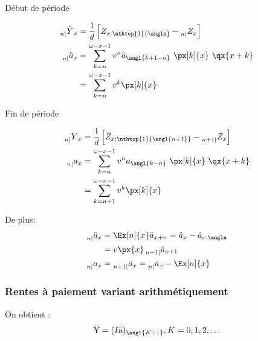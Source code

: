 \documentclass[10pt, french]{article}
\newcommand\cumlaut[2][black]{\stackon[.33ex]{#2}{\textcolor{#1}{\kern-.04ex.\kern-.2ex.}}}
\begin{document}
\begin{multicols*}{3}
\setlength{\mathindent}{-1cm}
\begin{minipage}[t]{0.5\columnwidth}
\begin{center}
Début de période
\end{center}
\begin{align*}
	\prescript{}{n|}{\ddot{Y}}_{x}
	&=	\frac{1}{d} \left[ Z_{x:\nthtop{1}{\angln}} - \prescript{}{n|}{Z_{x}} \right]	\\
	\prescript{}{n|}{\ddot{a}}_{x}	
	&=	\sum_{k = n}^{\omega - x - 1} v^{n} \ddot{a}_{\angl{k + 1 - n}} \ \px[k]{x} \ \qx{x + k}	\\
	&=	\sum_{k = n}^{\omega - x - 1} v^{k} \px[k]{x}
\end{align*}
\end{minipage}
\begin{minipage}[t]{0.5\columnwidth}
\begin{center}
Fin de période
\end{center}
\begin{align*}
	\prescript{}{n|}{Y}_{x}
	&=	\frac{1}{d} \left[ Z_{x:\nthtop{1}{\angl{n + 1}}} - \prescript{}{n + 1|}{Z_{x}} \right]	\\
	\prescript{}{n|}{a}_{x}
	&=	\sum_{k = n}^{\omega - x - 1} v^{n} a_{\angl{k - n}} \ \px[k]{x} \ \qx{x + k}	\\
	&=	\sum_{k = n + 1}^{\omega - x - 1} v^{k} \px[k]{x}
\end{align*}	
\end{minipage}
\setlength{\mathindent}{1cm}

De plus:
\begin{align*}
	\prescript{}{n|}{\ddot{a}}_{x}
	&=	\Ex[n]{x} \ddot{a}_{x + n}	
	=	\ddot{a}_{x} - \ddot{a}_{x:\angln}	\\
	&=	v \px{x} \prescript{}{n - 1|}{\ddot{a}}_{x + 1}	\\
	\prescript{}{n|}{a}_{x}
	&=	\prescript{}{n + 1|}{\ddot{a}}_{x}
	=	\prescript{}{n|}{\ddot{a}}_{x} - \Ex[n]{x}
\end{align*}



	

\columnbreak
\subsubsection*{\textcolor{amber(sae/ece)}{Rentes à paiement variant arithmétiquement}}
\begin{definitionNOHFILLprop}
On obtient :
\begin{align*}
	\cumlaut[cyan]{Y}
	&=	(I\cumlaut[cyan]{a})_{\angl{K \textcolor{cyan}{+ 1}}}, K = 0, 1, 2, \dots	\\
\end{align*}
\end{definitionNOHFILLprop}



\end{multicols*}
\end{document}
